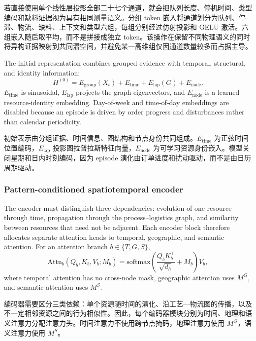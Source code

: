 \documentclass[a4paper,fleqn]{cas-dc}
\newcommand{\zhpara}[1]{%
  \par\begingroup\small\color{black!72}\noindent #1\par\endgroup}
\begin{document}
\zhpara{若直接使用单个线性层投影全部二十七个通道，就会把队列长度、停机时间、类型编码和缺料证据视为具有相同测量语义。分组 token 嵌入将通道划分为队列、停滞、物流、缺料、上下文和类型六组，每组分别经过仿射投影和 GELU 激活。六组嵌入随后取平均，而不是拼接成独立 token。该操作在保留不同物理语义的同时将异构证据映射到共同潜空间，并避免某一高维组仅因通道数量较多而占据主导。}

The initial representation combines grouped evidence with temporal, structural, and identity information:
\begin{equation}
H^{(0)}=E_{\mathrm{group}}(X_t)+
E_{\mathrm{time}}+E_{\mathrm{lap}}(G)+E_{\mathrm{node}}.
\end{equation}
$E_{\mathrm{time}}$ is sinusoidal, $E_{\mathrm{lap}}$ projects the graph eigenvectors, and $E_{\mathrm{node}}$ is a learned resource-identity embedding. Day-of-week and time-of-day embeddings are disabled because an episode is driven by order progress and disturbances rather than calendar periodicity.

\zhpara{初始表示由分组证据、时间信息、图结构和节点身份共同组成。$E_{\mathrm{time}}$ 为正弦时间位置编码，$E_{\mathrm{lap}}$ 投影图拉普拉斯特征向量，$E_{\mathrm{node}}$ 为可学习资源身份嵌入。模型关闭星期和日内时刻编码，因为 episode 演化由订单进度和扰动驱动，而不是由日历周期驱动。}

\subsubsection{Pattern-conditioned spatiotemporal encoder}

The encoder must distinguish three dependencies: evolution of one resource through time, propagation through the process--logistics graph, and similarity between resources that need not be adjacent. Each encoder block therefore allocates separate attention heads to temporal, geographic, and semantic attention. For an attention branch $b\in\{T,G,S\}$,
\begin{equation}
\mathrm{Attn}_{b}(Q_b,K_b,V_b;M_b)
=\mathrm{softmax}\!\left(
\frac{Q_bK_b^\top}{\sqrt{d_h}}+M_b
\right)V_b ,
\end{equation}
where temporal attention has no cross-node mask, geographic attention uses $M^G$, and semantic attention uses $M^S$.

\zhpara{编码器需要区分三类依赖：单个资源随时间的演化、沿工艺—物流图的传播，以及不一定相邻资源之间的行为相似性。因此，每个编码器模块分别为时间、地理和语义注意力分配注意力头。时间注意力不使用跨节点掩码，地理注意力使用 $M^G$，语义注意力使用 $M^S$。}
\end{document}
